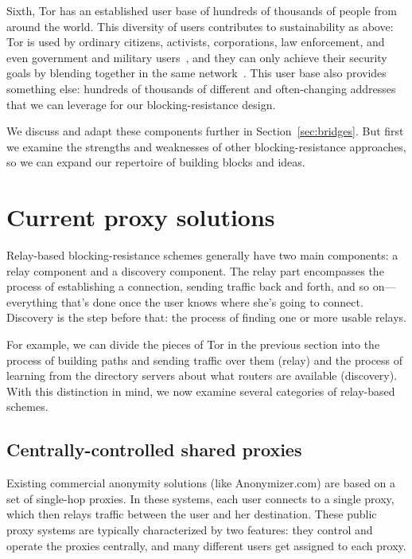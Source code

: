 \documentclass{llncs}
\begin{document}
Sixth, Tor has an established user base of hundreds of
thousands of people from around the world. This diversity of
users contributes to sustainability as above: Tor is used by
ordinary citizens, activists, corporations, law enforcement, and
even government and military users~\cite{tor-use-cases}, and they can
only achieve their security goals by blending together in the same
network~\cite{econymics,usability:weis2006}. This user base also provides
something else: hundreds of thousands of different and often-changing
addresses that we can leverage for our blocking-resistance design.

We discuss and adapt these components further in
Section~\ref{sec:bridges}. But first we examine the strengths and
weaknesses of other blocking-resistance approaches, so we can expand
our repertoire of building blocks and ideas.

\section{Current proxy solutions}
\label{sec:related}

Relay-based blocking-resistance schemes generally have two main
components: a relay component and a discovery component. The relay part
encompasses the process of establishing a connection, sending traffic
back and forth, and so on---everything that's done once the user knows
where she's going to connect. Discovery is the step before that: the
process of finding one or more usable relays.

For example, we can divide the pieces of Tor in the previous section
into the process of building paths and sending
traffic over them (relay) and the process of learning from the directory
servers about what routers are available (discovery).  With this distinction
in mind, we now examine several categories of relay-based schemes.

\subsection{Centrally-controlled shared proxies}

Existing commercial anonymity solutions (like Anonymizer.com) are based
on a set of single-hop proxies. In these systems, each user connects to
a single proxy, which then relays traffic between the user and her
destination. These public proxy
systems are typically characterized by two features: they control and
operate the proxies centrally, and many different users get assigned
to each proxy.
\end{document}
